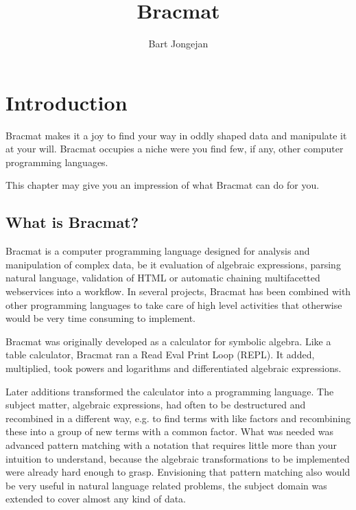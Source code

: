 \documentclass[12pt]{article}
\begin{document}
\title{Bracmat}
\author{Bart Jongejan}

\maketitle

\newpage

\tableofcontents

\newpage

\section{Introduction}

Bracmat makes it a joy to find your way in oddly shaped data and
manipulate it at your will. Bracmat occupies a niche were you find
few, if any, other computer programming languages.

This chapter may give you an impression of what Bracmat can do for
you.

\subsection{What is Bracmat?}

Bracmat is a computer programming language designed for analysis and
manipulation of complex data, be it evaluation of algebraic
expressions, parsing natural language, validation of HTML or automatic
chaining multifacetted webservices into a workflow. In several
projects, Bracmat has been combined with other programming languages
to take care of high level activities that otherwise would be very
time consuming to implement.

Bracmat was originally developed as a calculator for symbolic
algebra. Like a table calculator, Bracmat ran a Read Eval Print
Loop (REPL). It added, multiplied, took powers and logarithms and
differentiated algebraic expressions.

Later additions transformed the calculator into a programming
language. The subject matter, algebraic expressions, had often to be
destructured and recombined in a different way, e.g. to find terms
with like factors and recombining these into a group of new terms with
a common factor. What was needed was advanced pattern matching with a
notation that requires little more than your intuition to understand,
because the algebraic transformations to be implemented were already
hard enough to grasp. Envisioning that pattern matching also would be
very useful in natural language related problems, the subject domain
was extended to cover almost any kind of data.
\end{document}
